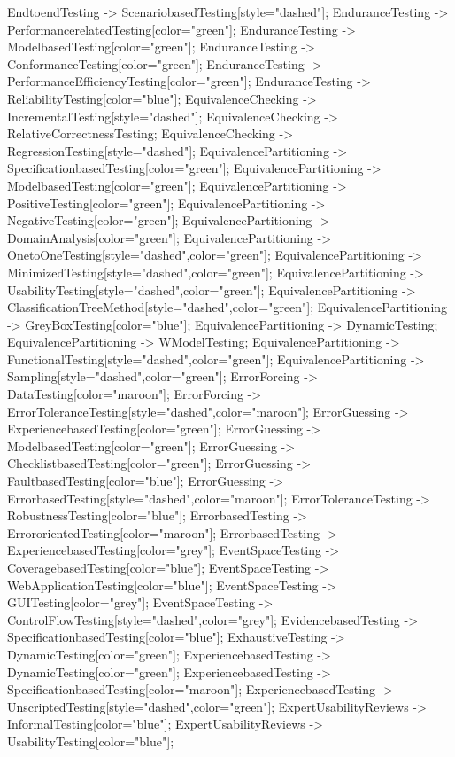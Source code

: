 \documentclass{article}
\begin{document}
{EndtoendTesting -> ScenariobasedTesting[style="dashed"];
EnduranceTesting -> PerformancerelatedTesting[color="green"];
EnduranceTesting -> ModelbasedTesting[color="green"];
EnduranceTesting -> ConformanceTesting[color="green"];
EnduranceTesting -> PerformanceEfficiencyTesting[color="green"];
EnduranceTesting -> ReliabilityTesting[color="blue"];
EquivalenceChecking -> IncrementalTesting[style="dashed"];
EquivalenceChecking -> RelativeCorrectnessTesting;
EquivalenceChecking -> RegressionTesting[style="dashed"];
EquivalencePartitioning -> SpecificationbasedTesting[color="green"];
EquivalencePartitioning -> ModelbasedTesting[color="green"];
EquivalencePartitioning -> PositiveTesting[color="green"];
EquivalencePartitioning -> NegativeTesting[color="green"];
EquivalencePartitioning -> DomainAnalysis[color="green"];
EquivalencePartitioning -> OnetoOneTesting[style="dashed",color="green"];
EquivalencePartitioning -> MinimizedTesting[style="dashed",color="green"];
EquivalencePartitioning -> UsabilityTesting[style="dashed",color="green"];
EquivalencePartitioning -> ClassificationTreeMethod[style="dashed",color="green"];
EquivalencePartitioning -> GreyBoxTesting[color="blue"];
EquivalencePartitioning -> DynamicTesting;
EquivalencePartitioning -> WModelTesting;
EquivalencePartitioning -> FunctionalTesting[style="dashed",color="green"];
EquivalencePartitioning -> Sampling[style="dashed",color="green"];
ErrorForcing -> DataTesting[color="maroon"];
ErrorForcing -> ErrorToleranceTesting[style="dashed",color="maroon"];
ErrorGuessing -> ExperiencebasedTesting[color="green"];
ErrorGuessing -> ModelbasedTesting[color="green"];
ErrorGuessing -> ChecklistbasedTesting[color="green"];
ErrorGuessing -> FaultbasedTesting[color="blue"];
ErrorGuessing -> ErrorbasedTesting[style="dashed",color="maroon"];
ErrorToleranceTesting -> RobustnessTesting[color="blue"];
ErrorbasedTesting -> ErrororientedTesting[color="maroon"];
ErrorbasedTesting -> ExperiencebasedTesting[color="grey"];
EventSpaceTesting -> CoveragebasedTesting[color="blue"];
EventSpaceTesting -> WebApplicationTesting[color="blue"];
EventSpaceTesting -> GUITesting[color="grey"];
EventSpaceTesting -> ControlFlowTesting[style="dashed",color="grey"];
EvidencebasedTesting -> SpecificationbasedTesting[color="blue"];
ExhaustiveTesting -> DynamicTesting[color="green"];
ExperiencebasedTesting -> DynamicTesting[color="green"];
ExperiencebasedTesting -> SpecificationbasedTesting[color="maroon"];
ExperiencebasedTesting -> UnscriptedTesting[style="dashed",color="green"];
ExpertUsabilityReviews -> InformalTesting[color="blue"];
ExpertUsabilityReviews -> UsabilityTesting[color="blue"];
}
\end{document}
